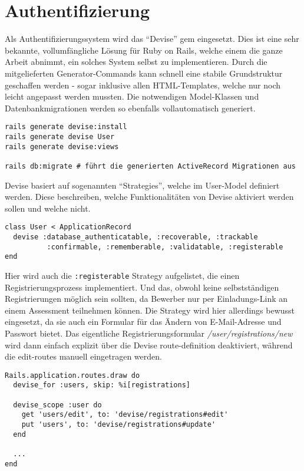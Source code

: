 
\section{Authentifizierung}

Als Authentifizierungssystem wird das \enquote{Devise} gem eingesetzt. Dies ist eine sehr bekannte, vollumfängliche Lösung für Ruby on Rails,
welche einem die ganze Arbeit abnimmt, ein solches System selbst zu implementieren. Durch die mitgelieferten Generator-Commands
kann schnell eine stabile Grundstruktur geschaffen werden - sogar inklusive allen HTML-Templates, welche nur noch leicht angepasst werden mussten. 
Die notwendigen Model-Klassen und Datenbankmigrationen werden so ebenfalls vollautomatisch generiert.

\begin{codebox}
\begin{verbatim}
rails generate devise:install
rails generate devise User
rails generate devise:views

rails db:migrate # führt die generierten ActiveRecord Migrationen aus
\end{verbatim}
\end{codebox}

Devise basiert auf sogenannten \enquote{Strategies}, welche im User-Model definiert werden. Diese beschreiben,
welche Funktionalitäten von Devise aktiviert werden sollen und welche nicht.

\begin{codebox}
\begin{verbatim}
class User < ApplicationRecord
  devise :database_authenticatable, :recoverable, :trackable
          :confirmable, :rememberable, :validatable, :registerable
end
\end{verbatim}
\end{codebox}

Hier wird auch die \texttt{:registerable} Strategy aufgelistet, die einen Registrierungsprozess implementiert.
Und das, obwohl keine selbstständigen Registrierungen möglich sein sollten, da Bewerber nur per Einladungs-Link an einem Assessment teilnehmen können. 
Die Strategy wird hier allerdings bewusst eingesetzt, da sie auch ein Formular für das Ändern von E-Mail-Adresse und Passwort bietet. 
Das eigentliche Registrierungsformular \emph{/user/registrations/new} wird dann einfach explizit über die Devise route-definition deaktiviert, während
die edit-routes manuell eingetragen werden.

\begin{codebox}
\begin{verbatim}
Rails.application.routes.draw do
  devise_for :users, skip: %i[registrations]

  devise_scope :user do
    get 'users/edit', to: 'devise/registrations#edit'
    put 'users', to: 'devise/registrations#update'
  end

  ...
end
\end{verbatim}
\end{codebox}

